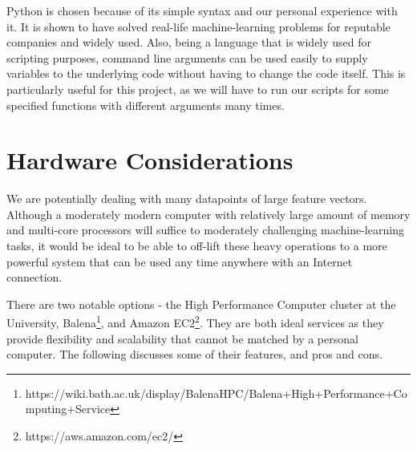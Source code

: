 Python is chosen because of its simple syntax and our personal experience with it. It is shown to have solved real-life machine-learning problems for reputable companies and widely used. Also, being a language that is widely used for scripting purposes, command line arguments can be used easily to supply variables to the underlying code without having to change the code itself. This is particularly useful for this project, as we will have to run our scripts for some specified functions with different arguments many times.

\section{Hardware Considerations}
We are potentially dealing with many datapoints of large feature vectors. Although a moderately modern computer with relatively large amount of memory and multi-core processors will suffice to moderately challenging machine-learning tasks, it would be ideal to be able to off-lift these heavy operations to a more powerful system that can be used any time anywhere with an Internet connection.

There are two notable options - the High Performance Computer cluster at the University, Balena\footnote{https://wiki.bath.ac.uk/display/BalenaHPC/Balena+High+Performance+Computing+Service}, and Amazon EC2\footnote{https://aws.amazon.com/ec2/}. They are both ideal services as they provide flexibility and scalability that cannot be matched by a personal computer. The following discusses some of their features, and pros and cons.

